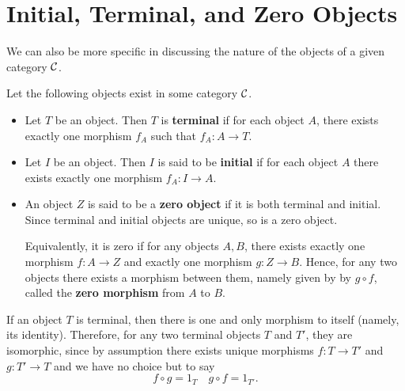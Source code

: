 


    \newpage
    \section{Initial, Terminal, and Zero Objects}
    We can also be more specific in discussing the nature of the
    objects of a given category $\mathcal{C}$.

    \begin{definition} 
        Let the following objects exist in some category $\mathcal{C}$. 
        \begin{itemize}
            \item Let $T$ be an object. Then $T$
            is \textbf{terminal} if for each object $A$, there
            exists exactly one morphism $f_A$ such that $f_A:
            A \to T$. 

            \item Let $I$ be an object. Then $I$ is said to be
            \textbf{initial} if for each object $A$ there exists
            exactly one 
            morphism $f_A : I \to A$. 

            \item An object $Z$ is said to be a \textbf{zero object}
            if it is both terminal and initial. Since terminal and initial objects 
            are unique, so is a zero object.
            
            Equivalently, it is
            zero if for any objects $A, B$, there exists exactly one
            morphism $f: A \to Z$ and exactly one morphism $g: Z  \to
            B$. Hence, for any two objects there exists a morphism between them,
            namely given by
            by $g \circ f$, called the \textbf{zero morphism} from $A$ 
            to $B$. 
        \end{itemize}
        If an object $T$ is terminal, then there is one and only
        morphism to itself (namely, its identity). Therefore,
        for any two terminal objects $T$ and $T'$, they are
        isomorphic, since by assumption there exists unique morphisms
        $f: T \to T'$ and $g: T' \to T$ and we have no choice but to
        say 
        \[
            f \circ g = 1_T \quad g \circ f = 1_{T'}.
        \]
    \end{definition}

